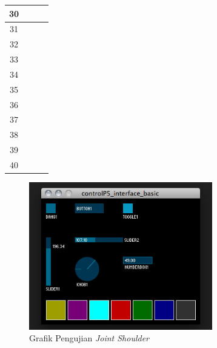 \begin{table}[]
\begin{tabular}{|c|c|c|c|}
		30 &                                                                                     &              &       \\ \hline
		31 &                                                                                     &              &       \\ \hline
		32 &                                                                                     &              &       \\ \hline
		33 &                                                                                     &              &       \\ \hline
		34 &                                                                                     &              &       \\ \hline
		35 &                                                                                     &              &       \\ \hline
		36 &                                                                                     &              &       \\ \hline
		37 &                                                                                     &              &       \\ \hline
		38 &                                                                                     &              &       \\ \hline
		39 &                                                                                     &              &       \\ \hline
		40 &                                                                                     &              &       \\ \hline
	\end{tabular}
	
\end{table} 
\begin{figure}[H]
	\centering
	\includegraphics[width=8cm]{gambar/controlp5.jpg}
	\caption{Grafik Pengujian \textit{Joint Shoulder}}
	\label{pic.jointshoulder}
\end{figure}

